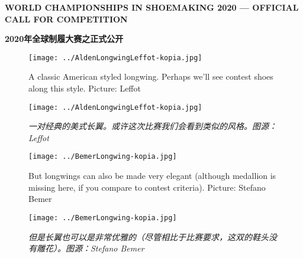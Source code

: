 \begin{paracol}{2}

    \setlength{\columnsep}{3.5em}
    \setlength{\columnseprule}{0.1pt}

    {\Large \textbf{WORLD CHAMPIONSHIPS IN SHOEMAKING 2020 --- OFFICIAL CALL FOR COMPETITION}}

    \vspace{1em}

    \switchcolumn
    {\Large \textbf{2020年全球制履大赛之正式公开}}
    \switchcolumn*

    \begin{figure}[h]
        \centering
        \texttt{[image: ../AldenLongwingLeffot-kopia.jpg]}
        \captionsetup{labelformat=empty}
        \caption{\tnr A classic American styled longwing. Perhaps we'll see contest shoes along this style. Picture: Leffot}
        \label{}
    \end{figure}

    \switchcolumn
    \begin{figure}[h]
        \centering
        \texttt{[image: ../AldenLongwingLeffot-kopia.jpg]}
        \captionsetup{labelformat=empty}
        \caption{\textit{一对经典的美式长翼。或许这次比赛我们会看到类似的风格。图源：\textnormal{{\tnr Leffot}}}}
        \label{}
    \end{figure}
    \switchcolumn*

    \begin{figure}[h]
        \centering
        \texttt{[image: ../BemerLongwing-kopia.jpg]}
        \captionsetup{labelformat=empty}
        \caption{\tnr But longwings can also be made very elegant (although medallion is missing here, if you compare to contest criteria). Picture: Stefano Bemer}
        \label{}
    \end{figure}

    \switchcolumn
    \begin{figure}[h]
        \centering
        \texttt{[image: ../BemerLongwing-kopia.jpg]}
        \captionsetup{labelformat=empty}
        \caption{\textit{但是长翼也可以是非常优雅的（尽管相比于比赛要求，这双的鞋头没有雕花）。图源：\textnormal{{\tnr Stefano Bemer}}}}
        \label{}
    \end{figure}


\end{paracol}
